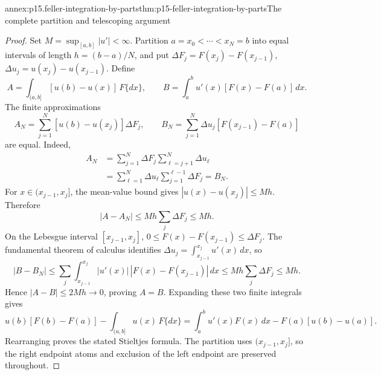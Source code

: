\begin{annexitem}{annex:p15.feller-integration-by-parts}{thm:p15-feller-integration-by-parts}{The complete partition and telescoping argument}
\begin{proof}
Set \(M=\sup_{[a,b]}|u'|<\infty\).
Partition \(a=x_0<\cdots<x_N=b\) into equal intervals of length
\(h=(b-a)/N\), and put
\(\Delta F_j=F(x_j)-F(x_{j-1})\),
\(\Delta u_j=u(x_j)-u(x_{j-1})\).
Define
\[
 A=\int_{(a,b]}[u(b)-u(x)]\,F\{dx\},\qquad
 B=\int_a^b u'(x)[F(x)-F(a)]\,dx.
\]
The finite approximations
\[
 A_N=\sum_{j=1}^N[u(b)-u(x_j)]\Delta F_j,\qquad
 B_N=\sum_{j=1}^N\Delta u_j[F(x_{j-1})-F(a)]
\]
are equal. Indeed,
\[
 \begin{aligned}
 A_N
 &=\sum_{j=1}^N\Delta F_j\sum_{\ell=j+1}^N\Delta u_\ell\\
 &=\sum_{\ell=1}^N\Delta u_\ell
                         \sum_{j=1}^{\ell-1}\Delta F_j
 =B_N.
 \end{aligned}
\]
For \(x\in(x_{j-1},x_j]\), the mean-value bound gives
\(|u(x)-u(x_j)|\leq Mh\). Therefore
\[
 |A-A_N|\leq Mh\sum_j\Delta F_j\leq Mh.
\]
On the Lebesgue interval \([x_{j-1},x_j]\),
\(0\leq F(x)-F(x_{j-1})\leq\Delta F_j\).
The fundamental theorem of calculus identifies
\(\Delta u_j=\int_{x_{j-1}}^{x_j}u'(x)\,dx\), so
\[
 |B-B_N|
 \leq\sum_j\int_{x_{j-1}}^{x_j}
           |u'(x)|\,|F(x)-F(x_{j-1})|\,dx
 \leq Mh\sum_j\Delta F_j\leq Mh.
\]
Hence \(|A-B|\leq2Mh\to0\), proving \(A=B\).
Expanding these two finite integrals gives
\[
 u(b)[F(b)-F(a)]-\int_{(a,b]}u(x)\,F\{dx\}
  =\int_a^b u'(x)F(x)\,dx-F(a)[u(b)-u(a)].
\]
Rearranging proves the stated Stieltjes formula. The partition uses
\((x_{j-1},x_j]\), so the right endpoint atoms and exclusion of
the left endpoint are preserved throughout.
\end{proof}
\end{annexitem}

